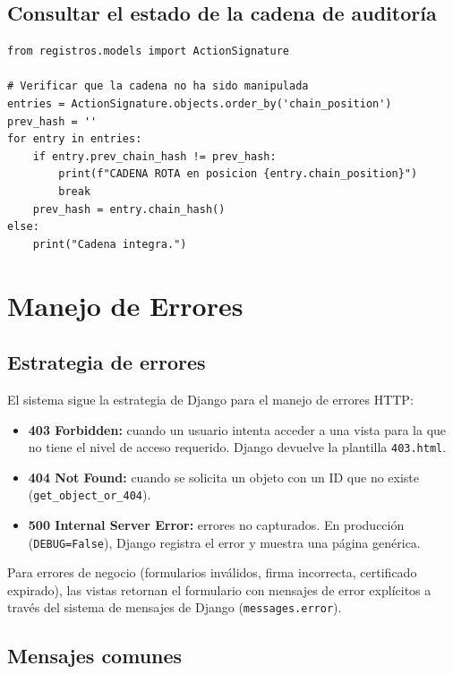 \documentclass[10pt,letterpaper]{report}
\begin{document}
\section{Consultar el estado de la cadena de auditoría}

\begin{lstlisting}[style=python]
from registros.models import ActionSignature

# Verificar que la cadena no ha sido manipulada
entries = ActionSignature.objects.order_by('chain_position')
prev_hash = ''
for entry in entries:
    if entry.prev_chain_hash != prev_hash:
        print(f"CADENA ROTA en posicion {entry.chain_position}")
        break
    prev_hash = entry.chain_hash()
else:
    print("Cadena integra.")
\end{lstlisting}

\chapter{Manejo de Errores}

\section{Estrategia de errores}

El sistema sigue la estrategia de Django para el manejo de errores HTTP:
\begin{itemize}[leftmargin=*]
    \item \textbf{403 Forbidden:} cuando un usuario intenta acceder a una vista para la que no tiene el nivel de acceso requerido. Django devuelve la plantilla \texttt{403.html}.
    \item \textbf{404 Not Found:} cuando se solicita un objeto con un ID que no existe (\texttt{get\_object\_or\_404}).
    \item \textbf{500 Internal Server Error:} errores no capturados. En producción (\texttt{DEBUG=False}), Django registra el error y muestra una página genérica.
\end{itemize}

Para errores de negocio (formularios inválidos, firma incorrecta, certificado expirado), las vistas retornan el formulario con mensajes de error explícitos a través del sistema de mensajes de Django (\texttt{messages.error}).

\section{Mensajes comunes}
\end{document}
